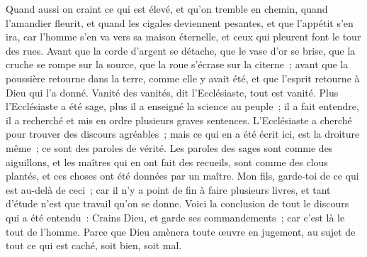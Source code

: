 \begin{multicols}{2}
Quand aussi on craint ce qui est élevé, et qu'on tremble en chemin, quand l'amandier fleurit, et quand les cigales deviennent pesantes, et que l'appétit s'en ira, car l'homme s'en va vers sa maison éternelle, et ceux qui pleurent font le tour des rues.
Avant que la corde d'argent se détache, que le vase d'or se brise, que la cruche se rompe sur la source, que la roue s'écrase sur la citerne~;
avant que la poussière retourne dans la terre, comme elle y avait été, et que l'esprit retourne à Dieu qui l'a donné.
Vanité des vanités, dit l'Ecclésiaste, tout est vanité.
Plus l'Ecclésiaste a été sage, plus il a enseigné la science au peuple~; il a fait entendre, il a recherché et mis en ordre plusieurs graves sentences. 
L'Ecclésiaste a cherché pour trouver des discours agréables~; mais ce qui en a été écrit ici, est la droiture même~; ce sont des paroles de vérité. 
Les paroles des sages sont comme des aiguillons, et les maîtres qui en ont fait des recueils, sont comme des clous plantés, et ces choses ont été données par un maître.
Mon fils, garde-toi de ce qui est au-delà de ceci~; car il n'y a point de fin à faire plusieurs livres, et tant d'étude n'est que travail qu'on se donne. 
Voici la conclusion de tout le discours qui a été entendu~: Crains Dieu, et garde ses commandements~; car c'est là le tout de l'homme.
Parce que Dieu amènera toute œuvre en jugement, au sujet de tout ce qui est caché, soit bien, soit mal.
\PPE{}
\end{multicols}
